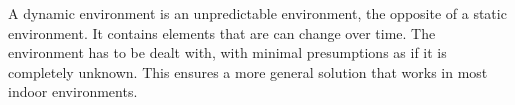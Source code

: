A dynamic environment is an unpredictable environment, the opposite of a static environment. It contains elements that are can change over time. The environment has to be dealt with, with minimal presumptions as if it is completely unknown. This ensures a more general solution that works in most indoor environments.